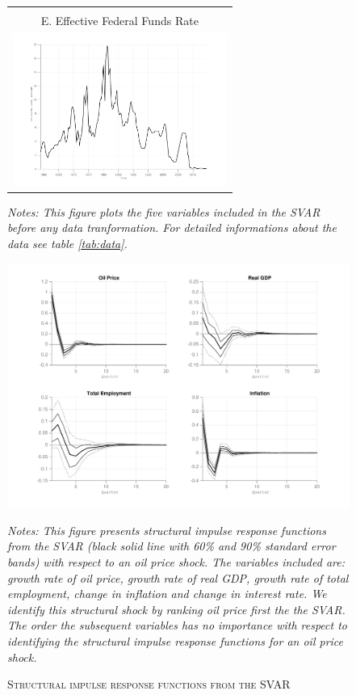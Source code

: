 \documentclass[11pt,a4paper]{article}
\begin{document}
\begin{figure}[H]
\begin{center}
\begin{tabular}{cc}
			&\\
			\multicolumn{2}{c}{E. Effective Federal Funds Rate}\\
			\multicolumn{2}{c}{\includegraphics[width=7cm]{Figures/Descriptive_FF}}\\
		\end{tabular}
	\end{center}
		\footnotesize{\emph{Notes:  
				This figure plots the five variables included in the SVAR before any data tranformation. For detailed informations about the data see table \ref{tab:data}.}}	
\end{figure}



\begin{figure}[H]
	\begin{center}
		\caption{\textsc{Structural impulse response functions from the SVAR}}
		\label{fig:SVAR_irf}
		\includegraphics[width=0.5\textheight]{Figures/SVAR_irf}
	\end{center}
	\footnotesize{\emph{Notes:
			This figure presents structural impulse response functions from the SVAR (black solid line with 60\% and 90\% standard error bands) with respect to an oil price shock. 
			The variables included are:  growth rate of  oil price,  growth rate of real GDP,  growth rate of total employment,  change in inflation and  change in interest rate.
			We identify this structural shock by ranking oil price first the the SVAR. The order the subsequent variables has no importance with respect to identifying the structural impulse response functions for an oil price shock.  }
	}
\end{figure}
\end{document}
